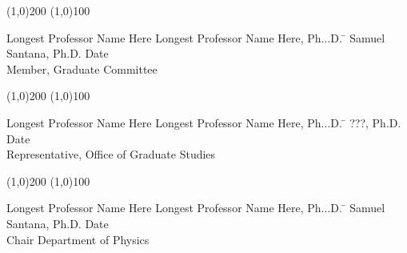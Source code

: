 \noindent
\line(1,0){200} \hspace{40 mm} \line(1,0){100}\\
\noindent
\vspace{-1.75\baselineskip}
\begin{tabbing}
	Longest Professor Name Here Longest Professor Name Here, Ph...D.   \=  \kill
	Samuel Santana, Ph.D. \>  Date\\Member, Graduate Committee
\end{tabbing}

\noindent
\line(1,0){200} \hspace{40 mm} \line(1,0){100}\\
\noindent
\vspace{-1.75\baselineskip}
\begin{tabbing}
	Longest Professor Name Here Longest Professor Name Here, Ph...D.   \=  \kill
	???, Ph.D. \>  Date\\Representative, Office of Graduate Studies
\end{tabbing}

\noindent
\line(1,0){200} \hspace{40 mm} \line(1,0){100}\\
\noindent
\vspace{-1.75\baselineskip}
\begin{tabbing}
	Longest Professor Name Here Longest Professor Name Here, Ph...D.   \=  \kill
	Samuel Santana, Ph.D. \>  Date\\Chair Department of Physics
\end{tabbing}
